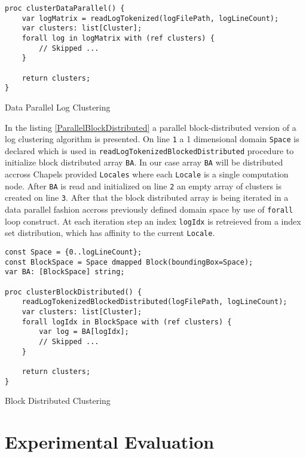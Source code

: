 \documentclass{article}
\begin{document}
\begin{listing}[H]
\begin{verbatim}
proc clusterDataParallel() {
	var logMatrix = readLogTokenized(logFilePath, logLineCount);
	var clusters: list[Cluster];
	forall log in logMatrix with (ref clusters) {
		// Skipped ...
	}

	return clusters;
}
\end{verbatim}
\caption{Data Parallel Log Clustering}
\label{DataParallelImplementationCode} 
\end{listing}

In the listing \ref{ParallelBlockDistributed} a parallel block-distributed version of a log clustering algorithm is presented. On line \texttt{1} a 1 dimensional domain \texttt{Space} is declared which is used in \texttt{readLogTokenizedBlockedDistributed} procedure to initialize block distributed array \texttt{BA}. In our case array \texttt{BA} will be distributed accross Chapels provided \texttt{Locales} where each \texttt{Locale} is a single computation node. After \texttt{BA} is read and initialized on line \texttt{2} an empty array of clusters is created on line \texttt{3}. After that the block distributed array is being iterated in a data parallel fashion accross previously defined domain space by use of \texttt{forall} loop construct. At each iteration step an index \texttt{logIdx} is retreieved from a index set distribution, which has affinity to the current \texttt{Locale}.
\begin{listing}[H]
\begin{verbatim}
const Space = {0..logLineCount};
const BlockSpace = Space dmapped Block(boundingBox=Space);
var BA: [BlockSpace] string;

proc clusterBlockDistributed() {
	readLogTokenizedBlockedDistributed(logFilePath, logLineCount);
	var clusters: list[Cluster];
	forall logIdx in BlockSpace with (ref clusters) {
        var log = BA[logIdx];
		// Skipped ...
	}

	return clusters;
}
\end{verbatim}
\caption{Block Distributed Clustering}
\label{ParallelBlockDistributed}
\end{listing}

\section{Experimental Evaluation}\label{ExperimentalEvaluationSection}
\end{document}

